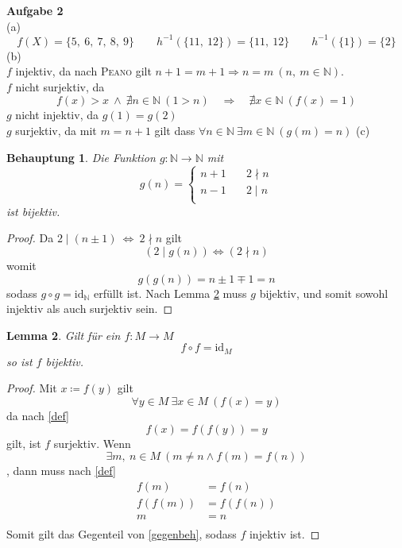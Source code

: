 \documentclass[a4paper, 12pt]{scrartcl}
\theoremstyle{plain}
\newtheorem{theorem}{Behauptung}
\newtheorem{lemma}[theorem]{Lemma}
\begin{document}
\textbf{Aufgabe 2}\\
(a)\\
\[ f(X) = \{ 5,\ 6,\ 7,\ 8,\ 9 \} \qquad h^{-1}\left( \{11,\ 12\} \right) = \{11,\ 12\} \qquad h^{-1}(\{1\}) = \{2\} \]
(b)\\
$f$ injektiv, da nach \textsc{Peano} gilt $n+1 = m+1 \Rightarrow n = m\ (n,\ m \in \mathbb{N})$. \\
$f$ nicht surjektiv, da
\[ f(x) > x \ \wedge\ \nexists n \in \mathbb{N}\ (1 > n) \quad \Rightarrow \quad \nexists x \in \mathbb{N}\ (f(x) = 1) \]
$g$ nicht injektiv, da $g(1) = g(2)$ \\
$g$ surjektiv, da mit $m = n+1$ gilt dass $\forall n \in \mathbb{N}\ \exists m \in \mathbb{N}\ (g(m) = n)$
\newpage
(c)
\begin{theorem}
Die Funktion $g : \mathbb{N} \rightarrow \mathbb{N}$ mit
\[ g(n) = \begin{cases} n+1 &\quad 2 \nmid n \\ n-1 &\quad 2 \mid n \\ \end{cases} \]
ist bijektiv.
\end{theorem}
\begin{proof}
Da $2 \mid (n \pm 1) \:\Leftrightarrow\: 2 \nmid n$ gilt
\[ (2 \mid g(n)) \Leftrightarrow (2 \nmid n) \]
womit
\[ g(g(n)) = n \pm 1 \mp 1 = n \]
sodass $g \circ g = \mathrm{id}_\mathbb{N}$ erfüllt ist. Nach Lemma \ref{klemma} muss $g$ bijektiv, und somit sowohl injektiv als auch surjektiv sein.
\end{proof}
\begin{lemma}\label{klemma}
Gilt für ein $f:M \rightarrow M$
\begin{equation}\label{def}
	f \circ f = \mathrm{id}_M
\end{equation}
so ist $f$ bijektiv.
\end{lemma}
\begin{proof}
Mit $x \coloneqq f(y)$ gilt
\[ \forall y \in M\ \exists x \in M\ (f(x) = y) \]
da nach \eqref{def}
\[ f(x) = f(f(y)) = y \]
gilt, ist $f$ surjektiv.
Wenn
\begin{equation}\label{gegenbeh}
	\exists m,\ n \in M\ (m \neq n \wedge f(m) = f(n))
\end{equation}
, dann muss nach \eqref{def}
\begin{align*}
	f(m) &= f(n) \\
	f(f(m)) &= f(f(n)) \\
	m &= n \\ %
\end{align*}
Somit gilt das Gegenteil von \eqref{gegenbeh}, sodass $f$ injektiv ist.
\end{proof}
\end{document}
